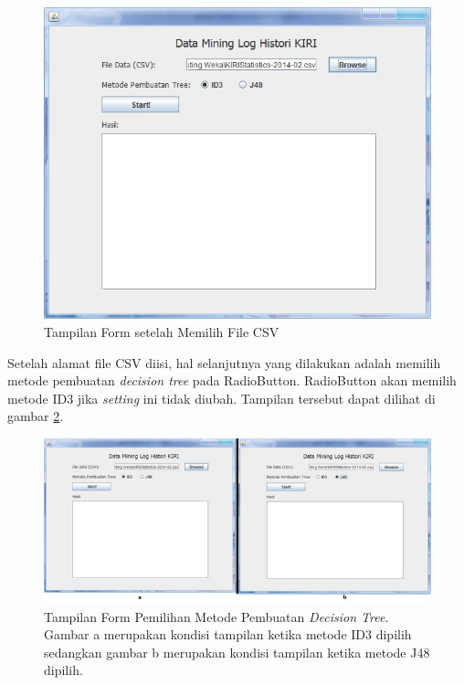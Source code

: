 \begin{figure}[H]
\centering
\includegraphics[scale=0.7]{Gambar/GUI3.jpg}
\caption[Tampilan Form setelah Memilih File CSV]{Tampilan Form setelah Memilih File CSV} 
\label{fig:GUI3}
\end{figure}

Setelah alamat file CSV diisi, hal selanjutnya yang dilakukan adalah memilih metode pembuatan \textsl{decision tree} pada RadioButton. RadioButton akan memilih metode ID3 jika \textsl{setting} ini tidak diubah. Tampilan tersebut dapat dilihat di gambar \ref{fig:GUI3and4}.

\begin{figure}[H]
\centering
\includegraphics[scale=0.7]{Gambar/GUI3and4.jpg}
\caption[Tampilan Form Pemilihan Metode Pembuatan \textsl{Decision Tree}]{Tampilan Form Pemilihan Metode Pembuatan \textsl{Decision Tree}. Gambar a merupakan kondisi tampilan ketika metode ID3 dipilih sedangkan gambar b merupakan kondisi tampilan ketika metode J48 dipilih.} 
\label{fig:GUI3and4}
\end{figure}

